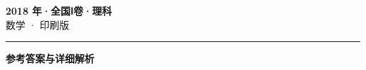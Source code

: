 \documentclass[zihao=5, a4paper]{ctexart}
\begin{document}
\begin{center}
  {\Large\bfseries 2018 年·全国Ⅰ卷·理科}\\[4pt]
  {\large 数学 · 印刷版}
\end{center}
\medskip
{}

\par\bigskip\hrule\bigskip
{}
\begin{center}{\large\bfseries 参考答案与详细解析}\end{center}
\smallskip

\end{document}
